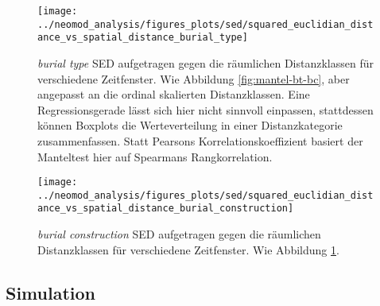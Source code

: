 \documentclass[openany,twoside,twocolumn]{book}
\begin{document}
\begin{landscape}
\begin{figure}
\texttt{[image: ../neomod\_analysis/figures\_plots/sed/squared\_euclidian\_distance\_vs\_spatial\_distance\_burial\_type]} \caption[\textit{burial type} SED aufgetragen gegen die räumlichen Distanzklassen]{\textit{burial type} SED aufgetragen gegen die räumlichen Distanzklassen für verschiedene Zeitfenster. Wie Abbildung \ref{fig:mantel-bt-bc}, aber angepasst an die ordinal skalierten Distanzklassen. Eine Regressionsgerade lässt sich hier nicht sinnvoll einpassen, stattdessen können Boxplots die Werteverteilung in einer Distanzkategorie zusammenfassen. Statt Pearsons Korrelationskoeffizient basiert der Manteltest hier auf Spearmans Rangkorrelation.}\label{fig:mantel-bt-spatial}
\end{figure}
\end{landscape}

\begin{landscape}
\begin{figure}
\texttt{[image: ../neomod\_analysis/figures\_plots/sed/squared\_euclidian\_distance\_vs\_spatial\_distance\_burial\_construction]} \caption[\textit{burial construction} SED aufgetragen gegen die räumlichen Distanzklassen]{\textit{burial construction} SED aufgetragen gegen die räumlichen Distanzklassen für verschiedene Zeitfenster. Wie Abbildung \ref{fig:mantel-bt-spatial}.}\label{fig:mantel-bc-spatial}
\end{figure}
\end{landscape}

\hypertarget{simulation-1}{%
\subsection{Simulation}\label{simulation-1}}
\end{document}

